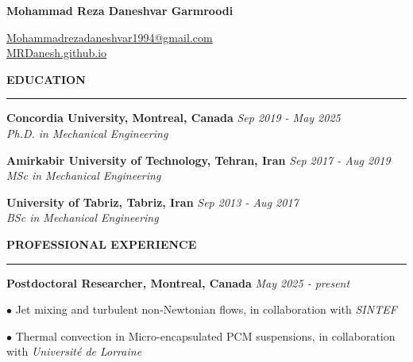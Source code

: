 \documentclass[10pt]{article}
\begin{document}
	
	\begin{center}
		{\color{violet}\Large \textbf{Mohammad Reza Daneshvar Garmroodi}}
		
		{\color{blue}\small \href{mailto:Mohammadrezadaneshvar1994@gmail.com}{Mohammadrezadaneshvar1994@gmail.com}} \\
		
		{\color{blue}\small \href{https://,rdanesh.github.io}{MRDanesh.github.io}}
	\end{center}
	 
	
	
	\vspace{3mm}
	
	
	\noindent \textbf{\color{violet} EDUCATION}
	
	\vspace{-2mm}
	
	\noindent\rule[0.5ex]{\linewidth}{1pt}
	
	
		{\noindent  \bf Concordia University, Montreal, Canada} \hfill {\em Sep 2019 - May 2025} 
		\\ \textit{Ph.D. in Mechanical Engineering}
		
		\vspace{1.5mm}
		
		{\noindent  \bf Amirkabir University of Technology, Tehran, Iran} \hfill {\em Sep 2017 - Aug 2019} 
		\\ \textit{MSc in Mechanical Engineering}
	
		\vspace{1.5mm}
		
		{\noindent \bf University of Tabriz, Tabriz, Iran} \hfill {\em Sep 2013 - Aug 2017} 
		\\ \textit{BSc in Mechanical Engineering}
		
		
		\vspace{2.5mm}
		
		
		\noindent \textbf{\color{violet} PROFESSIONAL EXPERIENCE}
		
		\vspace{-2mm}
		
		\noindent\rule[0.5ex]{\linewidth}{1pt}
		
		
		{\noindent  \bf Postdoctoral Researcher, Montreal, Canada} \hfill {\em May 2025 - present} 
		
		$\bullet$ Jet mixing and turbulent non-Newtonian flows, in collaboration with \textit{SINTEF }

		$\bullet$ Thermal convection in Micro-encapsulated PCM suspensions, in collaboration with \textit{Université de Lorraine} 
		
\end{document}
